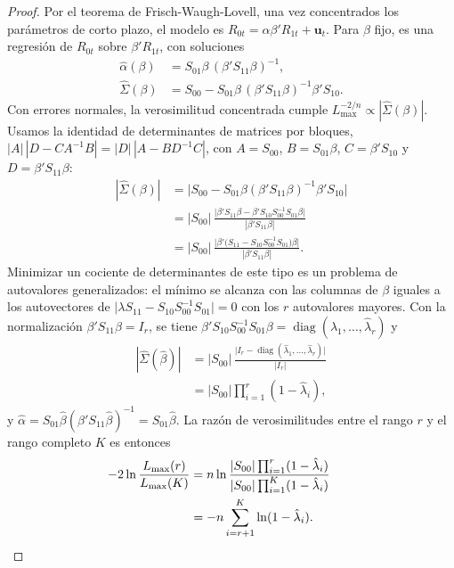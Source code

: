 \begin{proof}
Por el teorema de Frisch-Waugh-Lovell, una vez concentrados los parámetros de corto plazo, el modelo es
$R_{0t}=\alpha\beta'R_{1t}+\mathbf u_t$. Para $\beta$ fijo, es una regresión de $R_{0t}$ sobre
$\beta'R_{1t}$, con soluciones
\begin{align*}
  \hat\alpha(\beta)  &= S_{01}\beta\,(\beta'S_{11}\beta)^{-1},\\
  \hat\Sigma(\beta) &= S_{00}-S_{01}\beta\,(\beta'S_{11}\beta)^{-1}\beta'S_{10}.
\end{align*}
Con errores normales, la verosimilitud concentrada cumple $L_{\max}^{-2/n}\propto|\hat\Sigma(\beta)|$. Usamos la
identidad de determinantes de matrices por bloques,
$|A|\,|D-CA^{-1}B|=|D|\,|A-BD^{-1}C|$, con $A=S_{00}$, $B=S_{01}\beta$, $C=\beta'S_{10}$ y $D=\beta'S_{11}\beta$:
\begin{align*}
  |\hat\Sigma(\beta)| &= \bigl|S_{00}-S_{01}\beta(\beta'S_{11}\beta)^{-1}\beta'S_{10}\bigr|\\
                      &= |S_{00}|\,\frac{\bigl|\beta'S_{11}\beta-\beta'S_{10}S_{00}^{-1}S_{01}\beta\bigr|}{|\beta'S_{11}\beta|}\\
                      &= |S_{00}|\,\frac{\bigl|\beta'\bigl(S_{11}-S_{10}S_{00}^{-1}S_{01}\bigr)\beta\bigr|}{|\beta'S_{11}\beta|}.
\end{align*}
Minimizar un cociente de determinantes de este tipo es un problema de autovalores generalizados: el mínimo se
alcanza con las columnas de $\beta$ iguales a los autovectores de
$\bigl|\lambda S_{11}-S_{10}S_{00}^{-1}S_{01}\bigr|=0$ con los $r$ autovalores mayores. Con la normalización
$\beta'S_{11}\beta=I_r$, se tiene $\beta'S_{10}S_{00}^{-1}S_{01}\beta=\operatorname{diag}(\hat\lambda_1,\dots,\hat\lambda_r)$ y
\begin{align*}
  |\hat\Sigma(\hat\beta)| &= |S_{00}|\,\frac{\bigl|I_r-\operatorname{diag}(\hat\lambda_1,\dots,\hat\lambda_r)\bigr|}{|I_r|}\\
                          &= |S_{00}|\prod_{i=1}^{r}(1-\hat\lambda_i),
\end{align*}
y $\hat\alpha=S_{01}\hat\beta(\hat\beta'S_{11}\hat\beta)^{-1}=S_{01}\hat\beta$. La razón de verosimilitudes entre
el rango $r$ y el rango completo $K$ es entonces
\begin{align*}
  -2\ln\frac{L_{\max}(r)}{L_{\max}(K)} &= n\ln\frac{|S_{00}|\prod_{i=1}^{r}(1-\hat\lambda_i)}{|S_{00}|\prod_{i=1}^{K}(1-\hat\lambda_i)}\\
                                       &= -n\sum_{i=r+1}^{K}\ln(1-\hat\lambda_i). && \qedhere
\end{align*}
\end{proof}

